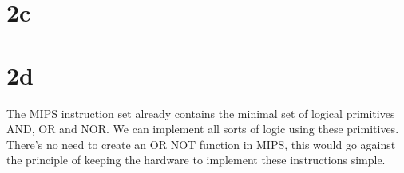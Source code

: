 \documentclass[10pt,a4paper]{article}
\begin{document}
\section*{2c}

\section*{2d}
The MIPS instruction set already contains the minimal set of logical primitives AND, OR and NOR. We can implement all sorts of logic using these primitives. There's no need to create an OR NOT function in MIPS, this would go against the principle of keeping the hardware to implement these instructions simple.
\end{document}
